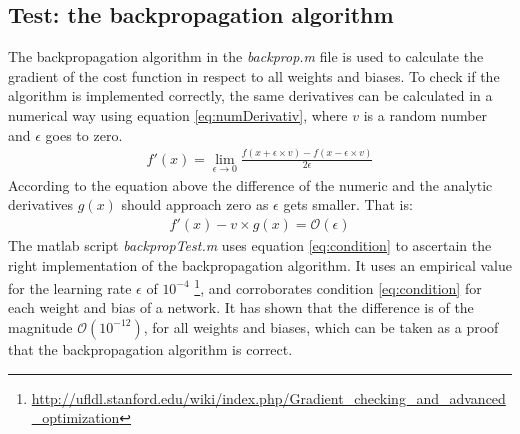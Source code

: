 
\subsection{Test: the backpropagation algorithm}
The backpropagation algorithm in the \textit{backprop.m} file is used to calculate the gradient of the cost function in respect to all weights and biases. To check if the algorithm is implemented correctly, the same derivatives can be calculated in a numerical way using equation \eqref{eq:numDerivativ}, where $v$ is a random number and $\epsilon$ goes to zero.
\begin{align}
    f'(x) = \lim_{\epsilon \to 0} \frac{f(x + \epsilon \times v) - f(x - \epsilon \times v )}{2\epsilon}
    \label{eq:numDerivativ}
\end{align}
According to the equation above the difference of the numeric and the analytic derivatives $g(x)$ should approach zero as $\epsilon$ gets smaller. That is:
\begin{align}
f'(x) -v\times g(x) = \mathcal{O}(\epsilon)
    \label{eq:condition}
\end{align}
The matlab script \textit{backpropTest.m} uses equation \eqref{eq:condition} to ascertain the right implementation of the backpropagation algorithm. It uses an empirical value for the learning rate $\epsilon$ of $10^{-4}$ \footnote{\url{http://ufldl.stanford.edu/wiki/index.php/Gradient_checking_and_advanced_optimization}}, and corroborates condition \eqref{eq:condition} for each weight and bias of a network. It has shown that the difference is of the magnitude $\mathcal{O}(10^{-12})$, for all weights and biases, which can be taken as a proof that the backpropagation algorithm is correct.  